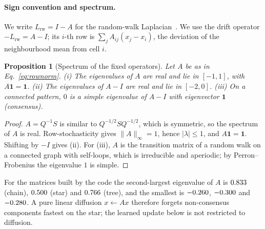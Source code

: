 \documentclass[10pt,twocolumn,letterpaper]{article}
\newtheorem{proposition}{Proposition}
\begin{document}
\paragraph{Sign convention and spectrum.} We write $L_{\text{rw}} = I - A$ for the random-walk Laplacian~\cite{chung1997spectral}. We use the drift operator $-L_{\text{rw}} = A - I$; its $i$-th row is $\sum_j A_{ij}(x_j - x_i)$, the deviation of the neighbourhood mean from cell $i$.
\begin{proposition}[Spectrum of the fixed operators]\label{prop:spectrum}
Let $A$ be as in Eq.~\eqref{eq:rownorm}. (i) The eigenvalues of $A$ are real and lie in $[-1,1]$, with $A\mathbf{1}=\mathbf{1}$. (ii) The eigenvalues of $A-I$ are real and lie in $[-2,0]$. (iii) On a connected pattern, $0$ is a simple eigenvalue of $A-I$ with eigenvector $\mathbf{1}$ (consensus).
\end{proposition}
\begin{proof}
$A = Q^{-1}S$ is similar to $Q^{-1/2} S Q^{-1/2}$, which is symmetric, so the spectrum of $A$ is real. Row-stochasticity gives $\|A\|_\infty = 1$, hence $|\lambda|\le 1$, and $A\mathbf{1}=\mathbf{1}$. Shifting by $-I$ gives (ii). For (iii), $A$ is the transition matrix of a random walk on a connected graph with self-loops, which is irreducible and aperiodic; by Perron--Frobenius the eigenvalue $1$ is simple.
\end{proof}
For the matrices built by the code the second-largest eigenvalue of $A$ is $0.833$ (chain), $0.500$ (star) and $0.766$ (tree), and the smallest is $-0.260$, $-0.300$ and $-0.280$. A pure linear diffusion $x \leftarrow A x$ therefore forgets non-consensus components fastest on the star; the learned update below is not restricted to diffusion.
\end{document}
